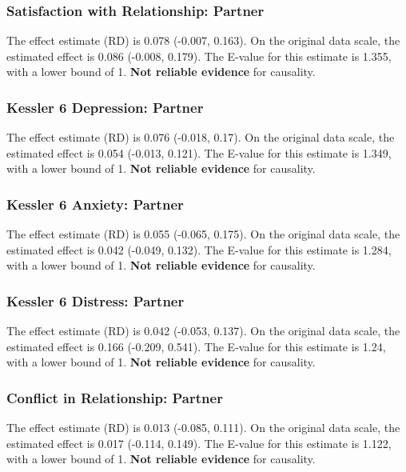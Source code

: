 \documentclass[
  singlecolumn]{article}
\begin{document}
\subsubsection{Satisfaction with Relationship:
Partner}\label{satisfaction-with-relationship-partner-14}

The effect estimate (RD) is 0.078 (-0.007, 0.163). On the original data
scale, the estimated effect is 0.086 (-0.008, 0.179). The E-value for
this estimate is 1.355, with a lower bound of 1. \textbf{Not reliable
evidence} for causality.

\subsubsection{Kessler 6 Depression:
Partner}\label{kessler-6-depression-partner-14}

The effect estimate (RD) is 0.076 (-0.018, 0.17). On the original data
scale, the estimated effect is 0.054 (-0.013, 0.121). The E-value for
this estimate is 1.349, with a lower bound of 1. \textbf{Not reliable
evidence} for causality.

\subsubsection{Kessler 6 Anxiety:
Partner}\label{kessler-6-anxiety-partner-14}

The effect estimate (RD) is 0.055 (-0.065, 0.175). On the original data
scale, the estimated effect is 0.042 (-0.049, 0.132). The E-value for
this estimate is 1.284, with a lower bound of 1. \textbf{Not reliable
evidence} for causality.

\subsubsection{Kessler 6 Distress:
Partner}\label{kessler-6-distress-partner-14}

The effect estimate (RD) is 0.042 (-0.053, 0.137). On the original data
scale, the estimated effect is 0.166 (-0.209, 0.541). The E-value for
this estimate is 1.24, with a lower bound of 1. \textbf{Not reliable
evidence} for causality.

\subsubsection{Conflict in Relationship:
Partner}\label{conflict-in-relationship-partner-14}

The effect estimate (RD) is 0.013 (-0.085, 0.111). On the original data
scale, the estimated effect is 0.017 (-0.114, 0.149). The E-value for
this estimate is 1.122, with a lower bound of 1. \textbf{Not reliable
evidence} for causality.
\end{document}
